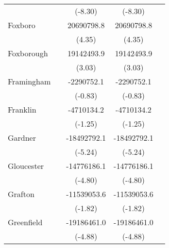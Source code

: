 {\begin{tabular}{l*{4}{c}}
                    &                     &     (-8.30)         &     (-8.30)         &                     \\
\addlinespace
Foxboro             &                     &  20690798.8\sym{***}&  20690798.8\sym{***}&                     \\
                    &                     &      (4.35)         &      (4.35)         &                     \\
\addlinespace
Foxborough          &                     &  19142493.9\sym{**} &  19142493.9\sym{**} &                     \\
                    &                     &      (3.03)         &      (3.03)         &                     \\
\addlinespace
Framingham          &                     &  -2290752.1         &  -2290752.1         &                     \\
                    &                     &     (-0.83)         &     (-0.83)         &                     \\
\addlinespace
Franklin            &                     &  -4710134.2         &  -4710134.2         &                     \\
                    &                     &     (-1.25)         &     (-1.25)         &                     \\
\addlinespace
Gardner             &                     & -18492792.1\sym{***}& -18492792.1\sym{***}&                     \\
                    &                     &     (-5.24)         &     (-5.24)         &                     \\
\addlinespace
Gloucester          &                     & -14776186.1\sym{***}& -14776186.1\sym{***}&                     \\
                    &                     &     (-4.80)         &     (-4.80)         &                     \\
\addlinespace
Grafton             &                     & -11539053.6         & -11539053.6         &                     \\
                    &                     &     (-1.82)         &     (-1.82)         &                     \\
\addlinespace
Greenfield          &                     & -19186461.0\sym{***}& -19186461.0\sym{***}&                     \\
                    &                     &     (-4.88)         &     (-4.88)         &                     \\

\end{tabular}}
